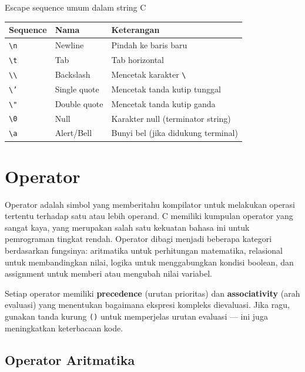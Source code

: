 \documentclass[../main.tex]{subfiles}
\begin{document}
\begin{modultable}[]{Escape sequence umum dalam string C}
\begin{tabular}{|l|l|p{7cm}|}
\hline
\textbf{Sequence} & \textbf{Nama} & \textbf{Keterangan} \\
\hline
\texttt{\textbackslash n} & Newline & Pindah ke baris baru \\
\hline
\texttt{\textbackslash t} & Tab & Tab horizontal \\
\hline
\texttt{\textbackslash\textbackslash} & Backslash & Mencetak karakter \texttt{\textbackslash} \\
\hline
\texttt{\textbackslash '} & Single quote & Mencetak tanda kutip tunggal \\
\hline
\texttt{\textbackslash "} & Double quote & Mencetak tanda kutip ganda \\
\hline
\texttt{\textbackslash 0} & Null & Karakter null (terminator string) \\
\hline
\texttt{\textbackslash a} & Alert/Bell & Bunyi bel (jika didukung terminal) \\
\hline
\end{tabular}
\end{modultable}

\section{Operator}

Operator adalah simbol yang memberitahu kompilator untuk melakukan operasi tertentu terhadap satu atau lebih operand. C memiliki kumpulan operator yang sangat kaya, yang merupakan salah satu kekuatan bahasa ini untuk pemrograman tingkat rendah. Operator dibagi menjadi beberapa kategori berdasarkan fungsinya: aritmatika untuk perhitungan matematika, relasional untuk membandingkan nilai, logika untuk menggabungkan kondisi boolean, dan assignment untuk memberi atau mengubah nilai variabel.

Setiap operator memiliki \textbf{precedence} (urutan prioritas) dan \textbf{associativity} (arah evaluasi) yang menentukan bagaimana ekspresi kompleks dievaluasi. Jika ragu, gunakan tanda kurung \texttt{()} untuk memperjelas urutan evaluasi --- ini juga meningkatkan keterbacaan kode.

\subsection{Operator Aritmatika}
\end{document}
